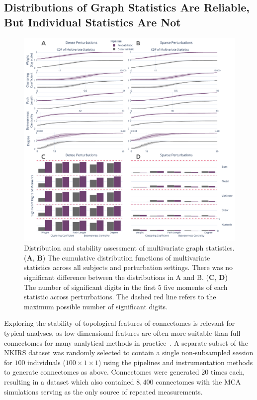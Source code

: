 \documentclass[fleqn,10pt]{SelfArx} %
\newcommand{\new}[1]{{#1}}
\begin{document}
\subsection*{Distributions of Graph Statistics Are Reliable, But Individual Statistics Are Not}
\begin{figure}[bht!]\centering
\includegraphics[width=\linewidth]{figures/fig2_multivariate_differences.pdf}
\caption{Distribution and stability assessment of multivariate graph statistics. (\textbf{A}, \textbf{B}) The
cumulative distribution functions of multivariate statistics across all subjects and perturbation settings. There was
no significant difference between the distributions in A and B. (\textbf{C}, \textbf{D}) The number of significant
digits in the first $5$ five moments of each statistic across perturbations. The dashed red line refers to the maximum
possible number of significant digits.}
\label{fig:multivar}
\end{figure}

Exploring the stability of topological features of connectomes is relevant for typical analyses, as low dimensional
features are often more suitable than full connectomes for many analytical methods in practice~\cite{Rubinov2010-fh}.
A separate subset of the NKIRS dataset was randomly selected to contain a single non-subsampled session for $100$
individuals \new{($100 \times 1 \times 1$) using the pipelines and instrumentation methods to generate connectomes as
above. Connectomes were generated $20$ times each, resulting in a dataset which also contained $8,400$ connectomes with
the MCA simulations serving as the only source of repeated measurements.}
\end{document}
